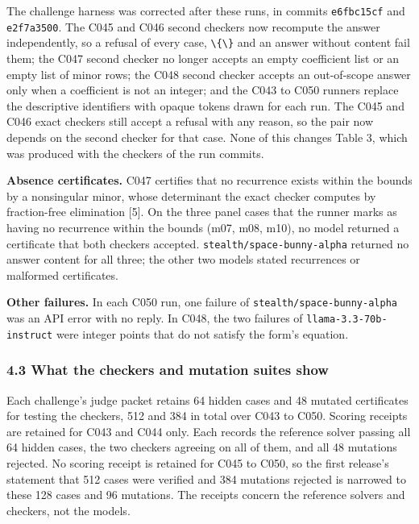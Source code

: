 \documentclass[
  11pt,
]{article}
\newcommand{\passthrough}[1]{#1}
\begin{document}
The challenge harness was corrected after these runs, in commits
\passthrough{\lstinline!e6fbc15cf!} and
\passthrough{\lstinline!e2f7a3500!}. The C045 and C046 second checkers
now recompute the answer independently, so a refusal of every case,
\passthrough{\lstinline!\{\}!} and an answer without content fail them;
the C047 second checker no longer accepts an empty coefficient list or
an empty list of minor rows; the C048 second checker accepts an
out-of-scope answer only when a coefficient is not an integer; and the
C043 to C050 runners replace the descriptive identifiers with opaque
tokens drawn for each run. The C045 and C046 exact checkers still accept
a refusal with any reason, so the pair now depends on the second checker
for that case. None of this changes Table 3, which was produced with the
checkers of the run commits.

\textbf{Absence certificates.} C047 certifies that no recurrence exists
within the bounds by a nonsingular minor, whose determinant the exact
checker computes by fraction-free elimination {[}5{]}. On the three
panel cases that the runner marks as having no recurrence within the
bounds (m07, m08, m10), no model returned a certificate that both
checkers accepted. \nolinkurl{stealth/space-bunny-alpha} returned no
answer content for all three; the other two models stated recurrences or
malformed certificates.

\textbf{Other failures.} In each C050 run, one failure of
\nolinkurl{stealth/space-bunny-alpha} was an API error with no reply. In
C048, the two failures of
\passthrough{\lstinline!llama-3.3-70b-instruct!} were integer points
that do not satisfy the form's equation.

\subsubsection{4.3 What the checkers and mutation suites
show}\label{what-the-checkers-and-mutation-suites-show}

Each challenge's judge packet retains 64 hidden cases and 48 mutated
certificates for testing the checkers, 512 and 384 in total over C043 to
C050. Scoring receipts are retained for C043 and C044 only. Each records
the reference solver passing all 64 hidden cases, the two checkers
agreeing on all of them, and all 48 mutations rejected. No scoring
receipt is retained for C045 to C050, so the first release's statement
that 512 cases were verified and 384 mutations rejected is narrowed to
these 128 cases and 96 mutations. The receipts concern the reference
solvers and checkers, not the models.
\end{document}
